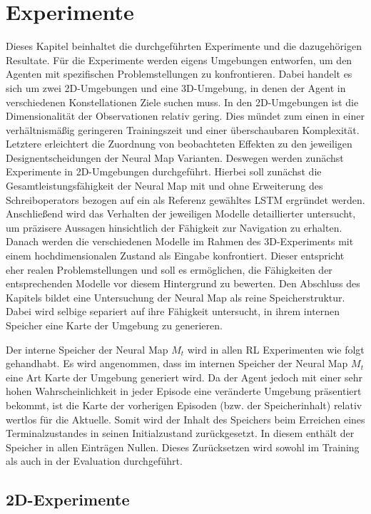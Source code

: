 \chapter{Experimente}
\label{chap_exp}

Dieses Kapitel beinhaltet die durchgeführten Experimente und die dazugehörigen Resultate. Für die Experimente werden eigens Umgebungen entworfen, um den Agenten mit spezifischen Problemstellungen zu konfrontieren. Dabei handelt es sich um zwei 2D-Umgebungen und eine 3D-Umgebung, in denen der Agent in verschiedenen Konstellationen Ziele suchen muss. In den 2D-Umgebungen ist die Dimensionalität der Observationen relativ gering. Dies mündet zum einen in einer verhältnismäßig geringeren Trainingszeit und einer überschaubaren Komplexität. Letztere erleichtert die Zuordnung von beobachteten Effekten zu den jeweiligen Designentscheidungen der Neural Map Varianten. Deswegen werden zunächst Experimente in 2D-Umgebungen durchgeführt. Hierbei soll zunächst die Gesamtleistungsfähigkeit der Neural Map mit und ohne Erweiterung des Schreiboperators bezogen auf ein als Referenz gewähltes \ac{LSTM} ergründet werden. Anschließend wird das Verhalten der jeweiligen Modelle detaillierter untersucht, um präzisere Aussagen hinsichtlich der Fähigkeit zur Navigation zu erhalten. Danach werden die verschiedenen Modelle im Rahmen des 3D-Experiments mit einem hochdimensionalen Zustand als Eingabe konfrontiert. Dieser entspricht eher realen Problemstellungen und soll es ermöglichen,  die Fähigkeiten der entsprechenden Modelle vor diesem Hintergrund zu bewerten. Den Abschluss des Kapitels bildet eine Untersuchung der Neural Map als reine Speicherstruktur. Dabei wird selbige separiert auf ihre Fähigkeit untersucht, in ihrem internen Speicher eine Karte der Umgebung zu generieren.

Der interne Speicher der Neural Map $M_t$ wird in allen \ac{RL} Experimenten wie folgt gehandhabt. Es wird angenommen, dass im internen Speicher der Neural Map $M_t$ eine Art Karte der Umgebung generiert wird. Da der Agent jedoch mit einer sehr hohen Wahrscheinlichkeit in jeder Episode eine veränderte Umgebung präsentiert bekommt, ist die Karte der vorherigen Episoden (bzw. der Speicherinhalt) relativ wertlos für die Aktuelle. Somit wird der Inhalt des Speichers beim Erreichen eines Terminalzustandes in seinen Initialzustand zurückgesetzt. In diesem enthält der Speicher in allen Einträgen Nullen. Dieses Zurücksetzen wird sowohl im Training als auch in der Evaluation durchgeführt.

\section{2D-Experimente}
\label{sec_2d_exp}

